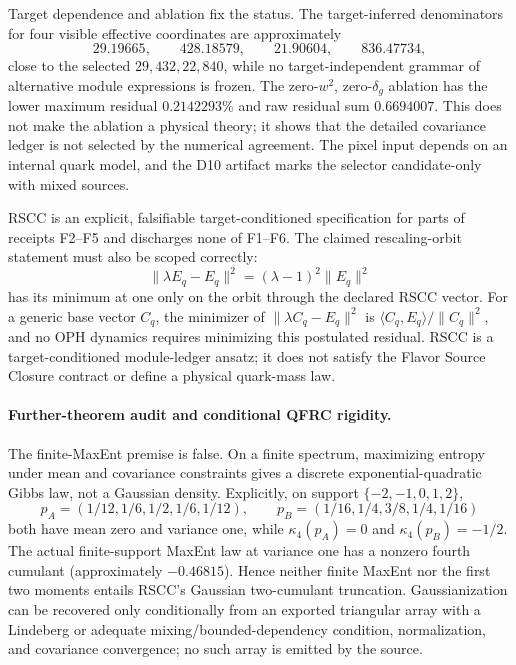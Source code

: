\documentclass[11pt]{article}
\begin{document}
Target dependence and ablation fix the status. The target-inferred denominators for four
visible effective coordinates are approximately
\[
29.19665,\qquad428.18579,\qquad21.90604,\qquad836.47734,
\]
close to the selected \(29,432,22,840\), while no target-independent grammar of alternative
module expressions is frozen. The zero-\(w^2\), zero-\(\delta_g\) ablation has the lower
maximum residual \(0.2142293\%\) and raw residual sum \(0.6694007\). This does not make
the ablation a physical theory; it shows that the detailed covariance ledger is not selected by
the numerical agreement. The pixel input depends on an internal quark model, and the
D10 artifact marks the selector candidate-only with mixed sources.

RSCC is an explicit, falsifiable target-conditioned specification for parts of receipts F2--F5
and discharges none of F1--F6. The claimed rescaling-orbit statement must also be scoped correctly:
\[
\|\lambda E_q-E_q\|^2=(\lambda-1)^2\|E_q\|^2
\]
has its minimum at one only on the orbit through the declared RSCC vector.  For a generic base
vector \(C_q\), the minimizer of \(\|\lambda C_q-E_q\|^2\) is
\(\langle C_q,E_q\rangle/\|C_q\|^2\), and no OPH dynamics requires minimizing this
postulated residual. RSCC is a target-conditioned module-ledger ansatz; it does not satisfy the
Flavor Source Closure contract or define a physical quark-mass law.

\paragraph{Further-theorem audit and conditional QFRC rigidity.}
The finite-MaxEnt premise is false. On a finite spectrum, maximizing
entropy under mean and covariance constraints gives a discrete exponential-quadratic Gibbs law,
not a Gaussian density.  Explicitly, on support \(\{-2,-1,0,1,2\}\),
\[
p_A=(1/12,1/6,1/2,1/6,1/12),\qquad
p_B=(1/16,1/4,3/8,1/4,1/16)
\]
both have mean zero and variance one, while
\(\kappa_4(p_A)=0\) and \(\kappa_4(p_B)=-1/2\).  The actual finite-support MaxEnt law at
variance one has a nonzero fourth cumulant (approximately \(-0.46815\)).  Hence neither finite
MaxEnt nor the first two moments entails RSCC's Gaussian two-cumulant truncation.  Gaussianization
can be recovered only conditionally from an exported triangular array with a Lindeberg or adequate
mixing/bounded-dependency condition, normalization, and covariance convergence; no such array is
emitted by the source.
\end{document}
